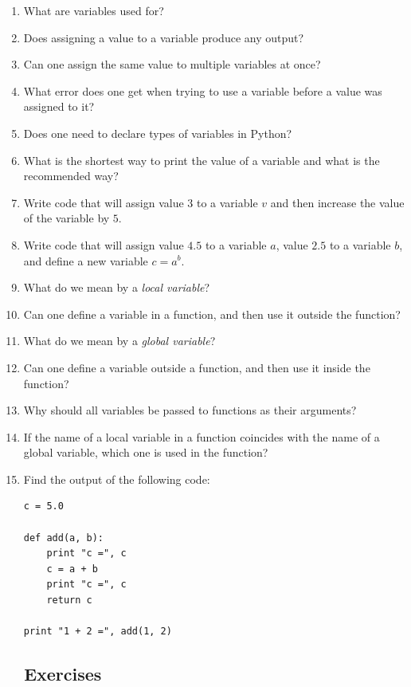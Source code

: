 \begin{enumerate}
\item What are variables used for?
\item Does assigning a value to a variable produce any output?
\item Can one assign the same value to multiple variables at once? 
\item What error does one get when trying to use a variable before a value was assigned to it?
\item Does one need to declare types of variables in Python?
\item What is the shortest way to print the value of a variable and what is the 
      recommended way?
\item Write code that will assign value $3$ to a variable $v$ and then increase the value of 
      the variable by $5$.
\item Write code that will assign value $4.5$ to a variable $a$, value $2.5$ to a variable 
      $b$, and define a new variable $c = a^b$. 
\item What do we mean by a {\em local variable}?
\item Can one define a variable in a function, and then use it outside the function?
\item What do we mean by a {\em global variable}?
\item Can one define a variable outside a function, and then use it inside the function? 
\item Why should all variables be passed to functions as their arguments?
\item If the name of a local variable in a function coincides with the name of a global variable,
      which one is used in the function? 
\item Find the output of the following code:
\begin{verbatim}
c = 5.0

def add(a, b):
    print "c =", c
    c = a + b
    print "c =", c
    return c

print "1 + 2 =", add(1, 2)
\end{verbatim}
\end{enumerate}

\subsection{\ \ Exercises}

